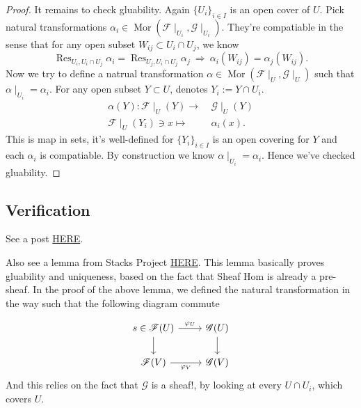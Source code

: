 \begin{proof}
It remains to check gluability. Again $\{U_i\}_{i\in I}$ is an open cover of $U$. Pick natural transformations $\alpha_i\in \operatorname{Mor}(\mathscr F\mid_{U_i},\mathscr G\mid_{U_i})$. They're compatiable in the sense that for any open subset $W_{ij}\subset U_i\cap U_j$, we know 
\[\operatorname{Res}_{U_i,U_i\cap U_j}\alpha_i=\operatorname{Res}_{U_j,U_i\cap U_j}\alpha_j ~\Rightarrow~ \alpha_i(W_{ij})=\alpha_{j}(W_{ij}).\]
Now we try to define a natrual transformation $\alpha\in\operatorname{Mor}(\mathscr F\mid_U,\mathscr G\mid_U)$ such that $\alpha\mid_{U_i}=\alpha_i$. For any open subset $Y\subset U$, denotes $Y_i:=Y\cap U_i$. 
\begin{align*}
	\alpha(Y) : \mathscr F\mid_{U}(Y)\to &~ \mathscr G\mid_{U}(Y)\\
	\mathscr F\mid_{U}(Y_i)\ni x \mapsto &~ \alpha_i(x).
\end{align*} 
This is map in sets, it's well-defined for $\{Y_i\}_{i\in I}$ is an open covering for $Y$ and each $\alpha_i$ is compatiable. By construction we know $\alpha\mid_{U_i}=\alpha_i$. Hence we've checked gluability.

\end{proof}

\subsection{Verification}

See a post \href{https://math.stackexchange.com/questions/294802/prove-that-sheaf-hom-is-a-sheaf}{HERE}.

Also see a lemma from Stacks Project \href{https://stacks.math.columbia.edu/tag/00AK}{HERE}. This lemma basically proves gluability and uniqueness, based on the fact that Sheaf Hom is already a pre-sheaf.
In the proof of the above lemma, we defined the natural transformation in the way such that the following diagram commute 

\[\begin{tikzcd}
	{s\in\mathscr F(U)} & {\mathscr G(U)} \\
	{\mathscr F(V)} & {\mathscr G(V)}
	\arrow["{\varphi_U}", from=1-1, to=1-2]
	\arrow[from=1-1, to=2-1]
	\arrow[from=1-2, to=2-2]
	\arrow["{\varphi_V}"', from=2-1, to=2-2]
\end{tikzcd}\]
And this relies on the fact that $\mathscr G$ is a sheaf!, by looking at every $U\cap U_i$, which covers $U$.

